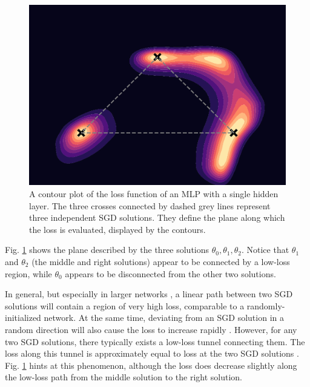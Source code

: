 \documentclass[12pt]{article}
\begin{document}
\begin{figure}[H]
\centering
\includegraphics[width=12cm]{plots/loss_landscape.pdf}
\caption{A contour plot of the loss function of an MLP with a single hidden layer. The three crosses connected by dashed grey lines represent three independent SGD solutions. They define the plane along which the loss is evaluated, displayed by the contours.}
\label{fig_loss_landscape}
\end{figure}

Fig. \ref{fig_loss_landscape} shows the plane described by the three solutions $\theta_0, \theta_1, \theta_2$. Notice that $\theta_1$ and $\theta_2$ (the middle and right solutions) appear to be connected by a low-loss region, while $\theta_0$ appears to be disconnected from the other two solutions.

In general, but especially in larger networks \cite{mode_connectivity}, a linear path between two SGD solutions will contain a region of very high loss, comparable to a randomly-initialized network. At the same time, deviating from an SGD solution in a random direction will also cause the loss to increase rapidly \cite{swag}. However, for any two SGD solutions, there typically exists a low-loss tunnel connecting them. The loss along this tunnel is approximately equal to loss at the two SGD solutions \cite{mode_connectivity}. Fig. \ref{fig_loss_landscape} hints at this phenomenon, although the loss does decrease slightly along the low-loss path from the middle solution to the right solution.
\end{document}
